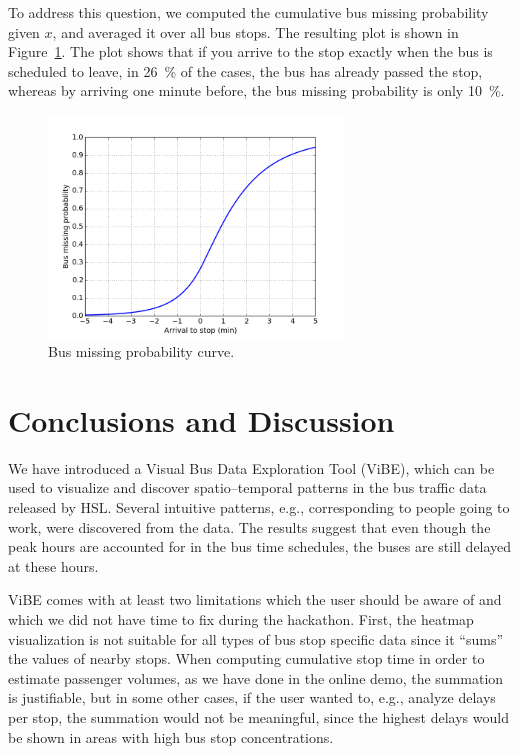 \documentclass[a4paper,12pt]{article}
\begin{document}
To address this question, we computed the cumulative bus missing probability 
given $x$, and averaged it over all bus stops. The resulting plot is shown in 
Figure~\ref{fig:miss_prob}. The plot shows that if you arrive to the stop 
exactly when the bus is scheduled to leave, in 26~\% of the cases, the bus has 
already passed the stop, whereas by arriving one minute before, the bus 
missing probability is only 10~\%.

\begin{figure}
\centering
\includegraphics[width=0.7\textwidth]{bus_missing_prob.png}
\caption{Bus missing probability curve.}
\label{fig:miss_prob}
\end{figure}


\section{Conclusions and Discussion} \label{sec:conc}

We have introduced a Visual Bus Data Exploration Tool (ViBE), which can be used 
to visualize and discover spatio--temporal patterns in the bus traffic data 
released by HSL. Several intuitive patterns, e.g., corresponding to people 
going to work, were discovered from the data. The results suggest that even 
though the peak hours are accounted for in the bus time schedules, the buses 
are still delayed at these hours.

ViBE comes with at least two limitations which the user should be aware of and 
which we did not have time to fix during the hackathon. First, the heatmap 
visualization is not suitable for all types of bus stop specific data since it 
``sums'' the values of nearby stops. When computing cumulative stop time in 
order to estimate passenger volumes, as we have done in the online demo, the 
summation is justifiable, but in some other cases, if the user wanted to, e.g., 
analyze delays per stop, the summation would not be meaningful, since the 
highest delays would be shown in areas with high bus stop concentrations. 
\end{document}
